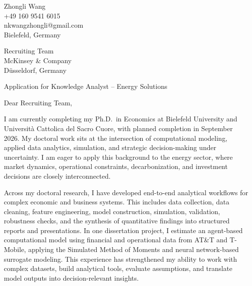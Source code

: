 \documentclass[11pt]{article}
\begin{document}
\begin{flushright}
Zhongli Wang \\
+49 160 9541 6015 \\
nkwangzhongli@gmail.com \\
Bielefeld, Germany \\
\end{flushright}

\vspace{0.1cm}

\noindent
Recruiting Team \\
McKinsey \& Company \\
D\"usseldorf, Germany \\

\vspace{0.1cm}

\noindent
Application for Knowledge Analyst -- Energy Solutions \\

\vspace{0.05cm}

\noindent Dear Recruiting Team,

I am currently completing my Ph.D.\ in Economics at Bielefeld University and Universit\`a Cattolica del Sacro Cuore, with planned completion in September 2026. My doctoral work sits at the intersection of computational modeling, applied data analytics, simulation, and strategic decision-making under uncertainty. I am eager to apply this background to the energy sector, where market dynamics, operational constraints, decarbonization, and investment decisions are closely interconnected.

Across my doctoral research, I have developed end-to-end analytical workflows for complex economic and business systems. This includes data collection, data cleaning, feature engineering, model construction, simulation, validation, robustness checks, and the synthesis of quantitative findings into structured reports and presentations. In one dissertation project, I estimate an agent-based computational model using financial and operational data from AT\&T and T-Mobile, applying the Simulated Method of Moments and neural network-based surrogate modeling. This experience has strengthened my ability to work with complex datasets, build analytical tools, evaluate assumptions, and translate model outputs into decision-relevant insights.
\end{document}
